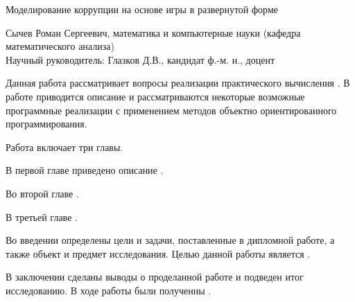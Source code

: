 {\Large Моделирование коррупции на основе игры в развернутой форме
\par}
{\large 
	Сычев Роман Сергеевич, математика  и компьютерные науки (кафедра математического анализа)\\
	Научный руководитель: Глазков Д.В., кандидат ф.-м. н., доцент
\par}
Данная работа рассматривает вопросы реализации практического вычисления  . В работе приводится описание  и рассматриваются некоторые возможные программные реализации с применением методов объектно ориентированного программирования.
\par
Работа включает три главы. 
\par
В первой главе приведено описание .
\par
Во второй главе .
\par
В третьей главе .
\par

Во введении определены цели и задачи, поставленные в дипломной работе, а также объект и предмет исследования. Целью данной работы является .
\par
В заключении сделаны выводы о проделанной работе и подведен итог исследованию. В ходе работы были полученны .